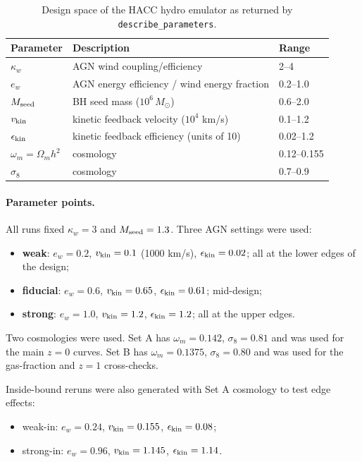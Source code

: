 \documentclass[11pt,a4paper]{article}
\begin{document}
\begin{table}
\centering
\begin{tabular}{lll}
\toprule
Parameter & Description & Range \\
\midrule
$\kappa_w$ & AGN wind coupling/efficiency & 2--4 \\
$e_w$ & AGN energy efficiency / wind energy fraction & 0.2--1.0 \\
$M_{\rm seed}$ & BH seed mass ($10^6\,M_\odot$) & 0.6--2.0 \\
$v_{\rm kin}$ & kinetic feedback velocity ($10^4$ km/s) & 0.1--1.2 \\
$\epsilon_{\rm kin}$ & kinetic feedback efficiency (units of 10) & 0.02--1.2 \\
$\omega_m=\Omega_m h^2$ & cosmology & 0.12--0.155 \\
$\sigma_8$ & cosmology & 0.7--0.9 \\
\bottomrule
\end{tabular}
\caption{Design space of the HACC hydro emulator as returned by \texttt{describe\_parameters}.}
\label{tab:params}
\end{table}

\paragraph{Parameter points.} All runs fixed $\kappa_w=3$ and $M_{\rm seed}=1.3$. Three AGN settings were used:
\begin{itemize}
\item \textbf{weak}: $e_w=0.2$, $v_{\rm kin}=0.1$ (1000 km/s), $\epsilon_{\rm kin}=0.02$; all at the lower edges of the design;
\item \textbf{fiducial}: $e_w=0.6$, $v_{\rm kin}=0.65$, $\epsilon_{\rm kin}=0.61$; mid-design;
\item \textbf{strong}: $e_w=1.0$, $v_{\rm kin}=1.2$, $\epsilon_{\rm kin}=1.2$; all at the upper edges.
\end{itemize}

Two cosmologies were used. Set A has $\omega_m=0.142$, $\sigma_8=0.81$ and was used for the main $z=0$ curves. Set B has $\omega_m=0.1375$, $\sigma_8=0.80$ and was used for the gas-fraction and $z=1$ cross-checks.

Inside-bound reruns were also generated with Set A cosmology to test edge effects:
\begin{itemize}
\item weak-in: $e_w=0.24$, $v_{\rm kin}=0.155$, $\epsilon_{\rm kin}=0.08$;
\item strong-in: $e_w=0.96$, $v_{\rm kin}=1.145$, $\epsilon_{\rm kin}=1.14$.
\end{itemize}
\end{document}
